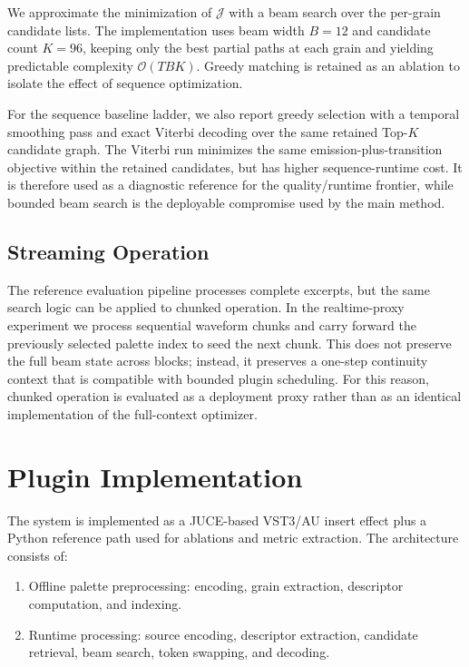 \documentclass[twoside,a4paper]{article}
\begin{document}
We approximate the minimization of $\mathcal{J}$ with a beam search over the per-grain candidate lists. The implementation uses beam width $B=12$ and candidate count $K=96$, keeping only the best partial paths at each grain and yielding predictable complexity $\mathcal{O}(T B K)$. Greedy matching is retained as an ablation to isolate the effect of sequence optimization.

For the sequence baseline ladder, we also report greedy selection with a temporal smoothing pass and exact Viterbi decoding over the same retained Top-$K$ candidate graph. The Viterbi run minimizes the same emission-plus-transition objective within the retained candidates, but has higher sequence-runtime cost. It is therefore used as a diagnostic reference for the quality/runtime frontier, while bounded beam search is the deployable compromise used by the main method.

\subsection{Streaming Operation}

The reference evaluation pipeline processes complete excerpts, but the same search logic can be applied to chunked operation. In the realtime-proxy experiment we process sequential waveform chunks and carry forward the previously selected palette index to seed the next chunk. This does not preserve the full beam state across blocks; instead, it preserves a one-step continuity context that is compatible with bounded plugin scheduling. For this reason, chunked operation is evaluated as a deployment proxy rather than as an identical implementation of the full-context optimizer.

\section{Plugin Implementation}\label{sec:implementation}

The system is implemented as a JUCE-based VST3/AU insert effect plus a Python reference path used for ablations and metric extraction. The architecture consists of:

\begin{enumerate}
    \item Offline palette preprocessing: encoding, grain extraction, descriptor computation, and indexing.
    \item Runtime processing: source encoding, descriptor extraction, candidate retrieval, beam search, token swapping, and decoding.
\end{enumerate}
\end{document}
